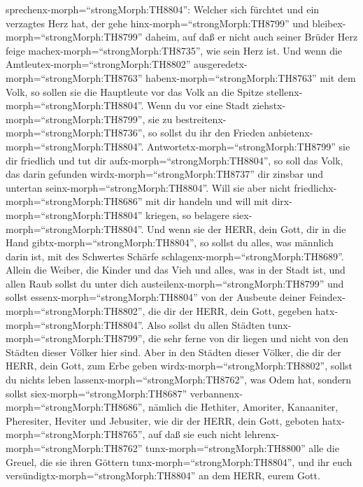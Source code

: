 sprechenx-morph=``strongMorph:TH8804'': Welcher sich fürchtet und ein
verzagtes Herz hat, der gehe hinx-morph=``strongMorph:TH8799'' und
bleibex-morph=``strongMorph:TH8799'' daheim, auf daß er nicht auch
seiner Brüder Herz feige machex-morph=``strongMorph:TH8735'', wie sein
Herz ist.  Und wenn die
Amtleutex-morph=``strongMorph:TH8802''
ausgeredetx-morph=``strongMorph:TH8763''
habenx-morph=``strongMorph:TH8763'' mit dem Volk, so sollen sie die
Hauptleute vor das Volk an die Spitze
stellenx-morph=``strongMorph:TH8804''.  Wenn du vor eine
Stadt ziehstx-morph=``strongMorph:TH8799'', sie zu
bestreitenx-morph=``strongMorph:TH8736'', so sollst du ihr den Frieden
anbietenx-morph=``strongMorph:TH8804''. 
Antwortetx-morph=``strongMorph:TH8799'' sie dir friedlich und tut dir
aufx-morph=``strongMorph:TH8804'', so soll das Volk, das darin gefunden
wirdx-morph=``strongMorph:TH8737'' dir zinsbar und untertan
seinx-morph=``strongMorph:TH8804''.  Will sie aber nicht
friedlichx-morph=``strongMorph:TH8686'' mit dir handeln und will mit
dirx-morph=``strongMorph:TH8804'' kriegen, so belagere
siex-morph=``strongMorph:TH8804''.  Und wenn sie der HERR,
dein Gott, dir in die Hand gibtx-morph=``strongMorph:TH8804'', so sollst
du alles, was männlich darin ist, mit des Schwertes Schärfe
schlagenx-morph=``strongMorph:TH8689''.  Allein die Weiber,
die Kinder und das Vieh und alles, was in der Stadt ist, und allen Raub
sollst du unter dich austeilenx-morph=``strongMorph:TH8799'' und sollst
essenx-morph=``strongMorph:TH8804'' von der Ausbeute deiner
Feindex-morph=``strongMorph:TH8802'', die dir der HERR, dein Gott,
gegeben hatx-morph=``strongMorph:TH8804''.  Also sollst du
allen Städten tunx-morph=``strongMorph:TH8799'', die sehr ferne von dir
liegen und nicht von den Städten dieser Völker hier sind. 
Aber in den Städten dieser Völker, die dir der HERR, dein Gott, zum Erbe
geben wirdx-morph=``strongMorph:TH8802'', sollst du nichts leben
lassenx-morph=``strongMorph:TH8762'', was Odem hat, 
sondern sollst siex-morph=``strongMorph:TH8687''
verbannenx-morph=``strongMorph:TH8686'', nämlich die Hethiter, Amoriter,
Kanaaniter, Pheresiter, Heviter und Jebusiter, wie dir der HERR, dein
Gott, geboten hatx-morph=``strongMorph:TH8765'',  auf daß
sie euch nicht lehrenx-morph=``strongMorph:TH8762''
tunx-morph=``strongMorph:TH8800'' alle die Greuel, die sie ihren Göttern
tunx-morph=``strongMorph:TH8804'', und ihr euch
versündigtx-morph=``strongMorph:TH8804'' an dem HERR, eurem Gott.
